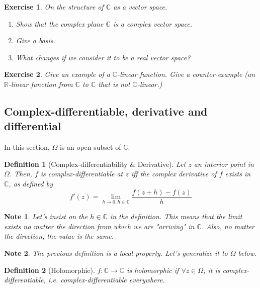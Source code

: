 \documentclass{article}
\newtheorem*{defi}{Definition}
\newtheorem*{note}{Note}
\newtheorem{exo}{Exercise}
\begin{document}
\begin{exo}
    On the structure of $\mathbb{C}$ as a vector space.
    \begin{enumerate}
        \item Show that the complex plane $\mathbb{C}$ is a complex vector space. 
        \item Give a basis. 
        \item What changes if we consider it to be a real vector space?
    \end{enumerate}
\end{exo}

\begin{exo}
    Give an example of a $\mathbb{C}$-linear function. Give a counter-example (an $\mathbb{R}$-linear function from $\mathbb{C}$ to $\mathbb{C}$ that is not $\mathbb{C}$-linear.)
\end{exo}


\subsection{Complex-differentiable, derivative and differential}
In this section, $\Omega$ is an open subset of $\mathbb{C}$.

\begin{defi}[Complex-differentiability \& Derivative]
    Let $z$ an interior point in $\Omega$. Then, $f$ is \emph{complex-differentiable} at $z$ iff the \emph{complex derivative} of $f$ exists in $\mathbb{C}$, as defined by 
    $$ f'(z) = \lim_{h\rightarrow 0, h\in\mathbb{C}}\frac{f(z+h) - f(z)}{h} $$ 
\end{defi}

\begin{note}
    Let's insist on the $h\in\mathbb{C}$ in the definition. This means that the limit exists no matter the direction from which we are "arriving" in $\mathbb{C}$. Also, no matter the direction, the value is the same.
\end{note}
\begin{note}
    The previous definition is a \emph{local} property. Let's generalize it to $\Omega$ below.
\end{note}

\begin{defi}[Holomorphic]
    $f: \mathbb{C} \rightarrow \mathbb{C}$ is \emph{holomorphic} if $\forall z\in\Omega$, it is \emph{complex-differentiable}, i.e. \emph{complex-differentiable everywhere.}
\end{defi}
 
\end{document}
